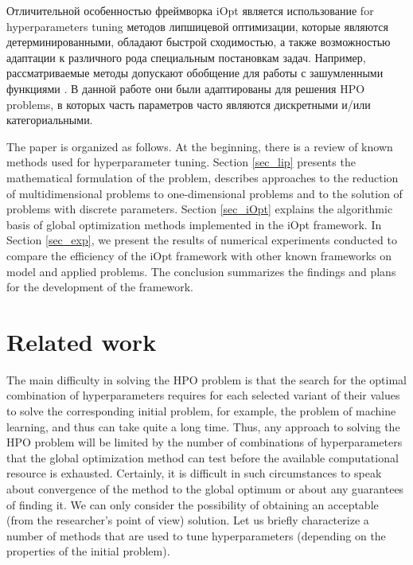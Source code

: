 \documentclass[iicol]{sn-jnl}
\theoremstyle{thmstyleone}%
\theoremstyle{thmstyletwo}%
\theoremstyle{thmstylethree}%
\begin{document}
\textcolor[rgb]{1,0,0}{Отличительной особенностью фреймворка iOpt является использование for hyperparameters tuning методов липшицевой оптимизации, которые являются детерминированными, обладают быстрой сходимостью, а также возможностью адаптации к различного рода специальным постановкам задач.
Например, рассматриваемые методы допускают обобщение для работы с зашумленными функциями \citep{Sergeyev2020}. В данной работе они были адаптированы для решения HPO problems, в которых часть параметров часто являются дискретными и/или категориальными.}

The paper is organized as follows. At the beginning, there is a review of known methods used for hyperparameter tuning. Section \ref{sec_lip} presents the mathematical formulation of the problem, describes approaches to the reduction of multidimensional problems to one-dimensional problems and to the solution of problems with discrete parameters. Section \ref{sec_iOpt} explains the algorithmic basis of global optimization methods implemented in the iOpt framework. In Section \ref{sec_exp}, we present the results of numerical experiments conducted to compare the efficiency of the iOpt framework with other known frameworks on model and applied problems. The conclusion summarizes the findings and plans   for the development of the framework.

\section{Related work}\label{sec_rel}

The main difficulty in solving the HPO problem is that the search for the optimal combination of hyperparameters requires for each selected variant of their values to solve the corresponding initial problem, for example, the problem of machine learning, and thus can take quite a long time. Thus, any approach to solving the HPO problem will be limited by the number of combinations of hyperparameters that the global optimization method can test before the available computational resource is exhausted.  Certainly, it is difficult in such circumstances to speak about convergence of the method to the global optimum or about any guarantees of finding it. We can only consider the possibility of obtaining an acceptable (from the researcher's point of view) solution. Let us briefly characterize a number of methods that are used to tune hyperparameters (depending on the properties of the initial problem). 
\end{document}
